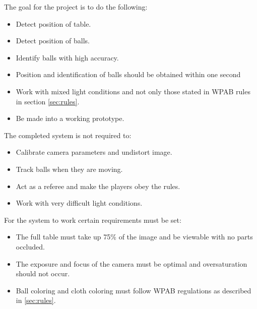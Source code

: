 The goal for the project is to do the following:

\begin{itemize}
\setlength{\itemsep}{0mm}
	\item Detect position of table.
	\item Detect position of balls.
	\item Identify balls with high accuracy.
	\item Position and identification of balls should be obtained within one second
	\item Work with mixed light conditions and not only those stated in WPAB rules in section \ref{sec:rules}.
	\item Be made into a working prototype.
\end{itemize}

The completed system is not required to:

\begin{itemize}
\setlength{\itemsep}{0mm}
	\item Calibrate camera parameters and undistort image.
	\item Track balls when they are moving.
	\item Act as a referee and make the players obey the rules.
	\item Work with very difficult light conditions.
\end{itemize}

For the system to work certain requirements must be set:
\begin{itemize}
\setlength{\itemsep}{0mm}
	\item The full table must take up 75\% of the image and  be viewable with no parts occluded.
	\item The exposure and focus of the camera must be optimal and oversaturation should not occur.
	\item Ball coloring and cloth coloring must follow WPAB regulations as described in \ref{sec:rules}.
\end{itemize}